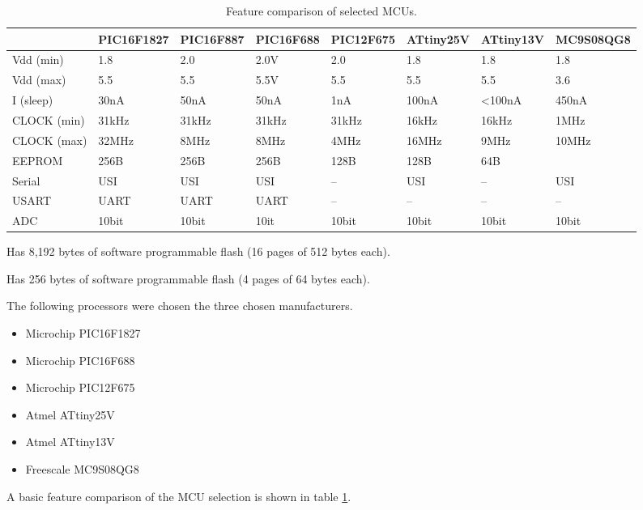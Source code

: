     \begin{table}
      \begin{centering}
        \begin{tabular}{|l|l|l|l|l|l|l|l|}
        \cline{2-8}
        \multicolumn{1}{l|}{} & PIC16F1827  & PIC16F887  & PIC16F688  & PIC12F675  & ATtiny25V  & ATtiny13V  & MC9S08QG8 \tabularnewline
        \hline
        Vdd (min)  & 1.8  & 2.0  & 2.0V  & 2.0  & 1.8  & 1.8  & 1.8 \tabularnewline
        Vdd (max)  & 5.5  & 5.5  & 5.5V  & 5.5  & 5.5  & 5.5  & 3.6 \tabularnewline
        I (sleep)  & 30nA  & 50nA  & 50nA  & 1nA  & 100nA & <100nA & 450nA\tabularnewline
        CLOCK (min)  & 31kHz  & 31kHz & 31kHz & 31kHz & 16kHz & 16kHz & 1MHz \tabularnewline
        CLOCK (max)  & 32MHz  & 8MHz  & 8MHz  & 4MHz  & 16MHz & 9MHz  & 10MHz\tabularnewline
        EEPROM  & 256B  & 256B  & 256B  & 128B  & 128B  & 64B  & \dag{}\tabularnewline
        Serial  & USI  & USI  & USI  & --  & USI  & --  & USI \tabularnewline
        USART  & UART  & UART  & UART  & --  & --  & --  & -- \tabularnewline
        ADC  & 10bit  & 10bit & 10it  & 10bit & 10bit & 10bit & 10bit\tabularnewline
        \hline
        \end{tabular}
      \end{centering}

      \begin{centering}
      \dag Has 8,192 bytes of software programmable flash (16 pages of 512 bytes each).
      \end{centering}

      \begin{centering}
      \ddag Has 256 bytes of software programmable flash (4 pages of 64 bytes each).
      \end{centering}

      \caption{\label{tab:MCUfeaturecomparison} Feature comparison of selected MCUs.}
    \end{table}

    The following processors were chosen the three chosen manufacturers.
    \begin{itemize}
    \item Microchip PIC16F1827
    \item Microchip PIC16F688
    \item Microchip PIC12F675
    \item Atmel ATtiny25V
    \item Atmel ATtiny13V
    \item Freescale MC9S08QG8
    \end{itemize}
    A basic feature comparison of the MCU selection is shown in table \ref{tab:MCUfeaturecomparison}.





